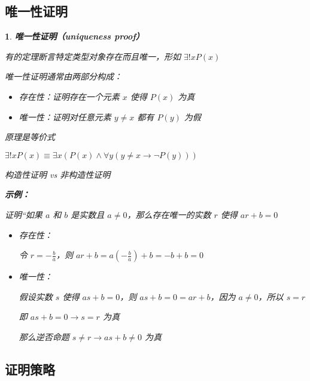 \documentclass[UTF8]{report}
\theoremstyle{MyLineTheoremStyle} %
\theoremstyle{MyBlockTheoremStyle} %
\theoremstyle{MySubsubsectionStyle} %
\newtheorem{definition}{}
\begin{document}
\subsection{唯一性证明}

\begin{definition}
    \textbf{唯一性证明（uniqueness proof）}\par
    有的定理断言特定类型对象存在而且唯一，形如 $\exists! x P(x)$\par
    唯一性证明通常由两部分构成：\par
    \begin{itemize}
        \item 存在性：证明存在一个元素 $x$ 使得 $P(x)$ 为真
        \item 唯一性：证明对任意元素 $y \neq x$ 都有 $P(y)$ 为假
    \end{itemize}
    原理是等价式\par
    $\exists! x P(x) \equiv \exists x (P(x) \land \forall y (y \neq x \rightarrow \neg P(y)))$\par
    构造性证明 vs 非构造性证明\par

    \textbf{示例：}\par
    证明“如果 $a$ 和 $b$ 是实数且 $a \neq 0$，那么存在唯一的实数 $r$ 使得 $ar + b = 0$\par
    \begin{itemize}
        \item 存在性：\par
        令 $r = -\frac{b}{a}$，则 $ar + b = a \left(-\frac{b}{a}\right) + b = -b + b = 0$
        \item 唯一性：\par
        假设实数 $s$ 使得 $as + b = 0$，则 $as + b = 0 = ar + b$，因为 $a \neq 0$，所以 $s = r$\par
        即 $as + b = 0 \rightarrow s = r$ 为真\par
        那么逆否命题 $s \neq r \rightarrow as + b \neq 0$ 为真\par
    \end{itemize}
\end{definition}

\subsection{证明策略}
\end{document}
